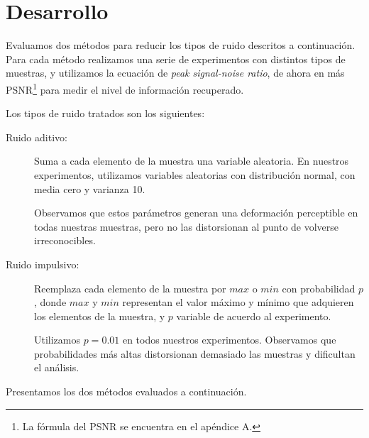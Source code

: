 \documentclass[a4paper,10pt,twoside]{article}
\begin{document}


\section{Desarrollo}

Evaluamos dos métodos para reducir los tipos de ruido descritos a continuación. Para cada método realizamos una serie de experimentos con distintos tipos de muestras, y utilizamos la ecuación de \textit{peak signal-noise ratio}, de ahora en más PSNR\footnote{La fórmula del PSNR se encuentra en el apéndice A.} para medir el nivel de información recuperado. 

Los tipos de ruido tratados son los siguientes:

\begin{description}

\item[Ruido aditivo:]

Suma a cada elemento de la muestra una variable aleatoria. En nuestros experimentos, utilizamos variables aleatorias con distribución normal, con media cero y varianza 10.

Observamos que estos parámetros generan una deformación perceptible en todas nuestras muestras, pero no las distorsionan al punto de volverse irreconocibles.

\item[Ruido impulsivo:]

Reemplaza cada elemento de la muestra por $max$ o $min$ con probabilidad $p$, donde $max$ y $min$ representan el valor máximo y mínimo que adquieren los elementos de la muestra, y $p$ variable de acuerdo al experimento.

Utilizamos $p = 0.01$ en todos nuestros experimentos. Observamos que probabilidades más altas distorsionan demasiado las muestras y dificultan el análisis.

\end{description}

Presentamos los dos métodos evaluados a continuación.


\end{document}
